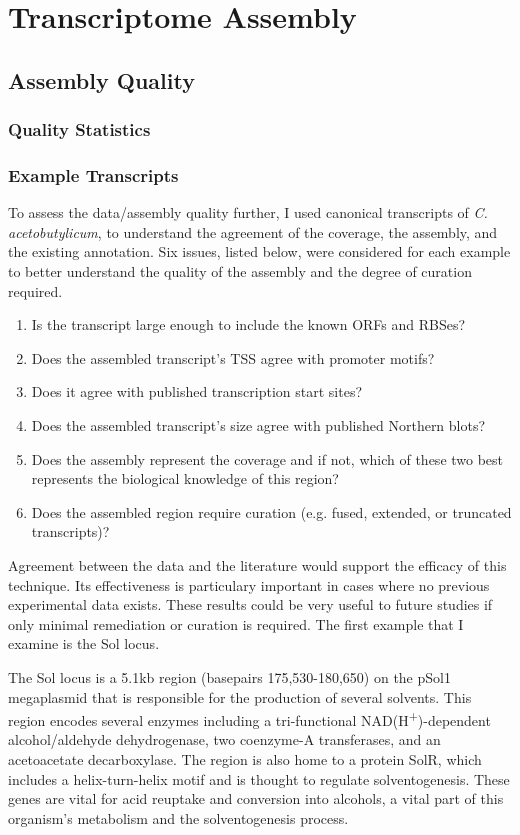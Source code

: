 

\section{Transcriptome Assembly}

\subsection{Assembly Quality}
\subsubsection{Quality Statistics}
\subsubsection{Example Transcripts}
To assess the data/assembly quality further, I used canonical transcripts of \textit{C. acetobutylicum}, to understand the agreement of the coverage, the assembly, and the existing annotation. Six issues, listed below, were considered for each example to better understand the quality of the assembly and the degree of curation required. 
\begin{enumerate}
\item Is the transcript large enough to include the known ORFs and RBSes?
\item Does the assembled transcript's TSS agree with promoter motifs?
\item Does it agree with published transcription start sites?
\item Does the assembled transcript's size agree with published Northern blots?
\item Does the assembly represent the coverage and if not, which of these two best represents the biological knowledge of this region?
\item Does the assembled region require curation (e.g. fused, extended, or truncated transcripts)?
\end{enumerate}
Agreement between the data and the literature would support the efficacy of this technique. Its effectiveness is particulary important in cases where no previous experimental data exists. These results could be very useful to future studies if only minimal remediation or curation is required. The first example that I examine is the Sol locus.

The Sol locus is a 5.1kb region (basepairs 175,530-180,650) on the pSol1 megaplasmid that is responsible for the production of several solvents. This region encodes several enzymes including a tri-functional NAD(H\textsuperscript{+})-dependent alcohol/aldehyde dehydrogenase, two coenzyme-A transferases, and an acetoacetate decarboxylase. The region is also home to a protein SolR, which includes a helix-turn-helix motif and is thought to regulate solventogenesis. These genes are vital for acid reuptake and conversion into alcohols, a vital part of this organism's metabolism and the solventogenesis process.


